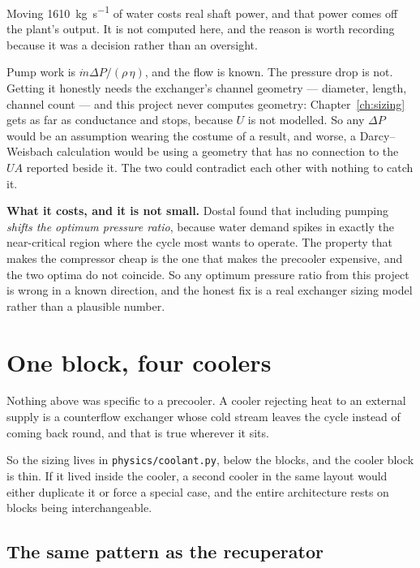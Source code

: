 \documentclass[11pt,a4paper]{report}
\newcommand{\code}[1]{\texttt{\small #1}}
\begin{document}
\begin{caveat}[title={Caveat: cooling-water pumping power is not modelled, deliberately}]
Moving \SI{1610}{\kilogram\per\second} of water costs real shaft power, and
that power comes off the plant's output. It is not computed here, and the
reason is worth recording because it was a decision rather than an
oversight.

Pump work is $\dot m \Delta P / (\rho\, \eta)$, and the flow is known. The
pressure drop is not. Getting it honestly needs the exchanger's channel
geometry --- diameter, length, channel count --- and this project never
computes geometry: Chapter~\ref{ch:sizing} gets as far as conductance and
stops, because $U$ is not modelled. So any $\Delta P$ would be an assumption
wearing the costume of a result, and worse, a Darcy--Weisbach calculation
would be using a geometry that has no connection to the $UA$ reported beside
it. The two could contradict each other with nothing to catch it.

\textbf{What it costs, and it is not small.} Dostal found that including
pumping \emph{shifts the optimum pressure ratio}, because water demand
spikes in exactly the near-critical region where the cycle most wants to
operate. The property that makes the compressor cheap is the one that makes
the precooler expensive, and the two optima do not coincide. So any optimum
pressure ratio from this project is wrong in a known direction, and the
honest fix is a real exchanger sizing model rather than a plausible number.
\end{caveat}

\section{One block, four coolers}
\label{sec:coolerblock}

Nothing above was specific to a precooler. A cooler rejecting heat to an
external supply is a counterflow exchanger whose cold stream leaves the
cycle instead of coming back round, and that is true wherever it sits.

So the sizing lives in \code{physics/coolant.py}, below the blocks, and the
cooler block is thin. If it lived inside the cooler, a second cooler in the
same layout would either duplicate it or force a special case, and the
entire architecture rests on blocks being interchangeable.

\subsection{The same pattern as the recuperator}
\end{document}
